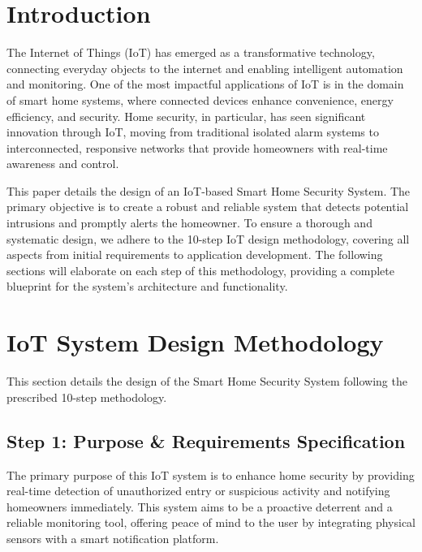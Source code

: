 \documentclass[conference]{IEEEtran}
\begin{document}

\section{Introduction}

The Internet of Things (IoT) has emerged as a transformative technology, connecting everyday objects to the internet and enabling intelligent automation and monitoring. One of the most impactful applications of IoT is in the domain of smart home systems, where connected devices enhance convenience, energy efficiency, and security. Home security, in particular, has seen significant innovation through IoT, moving from traditional isolated alarm systems to interconnected, responsive networks that provide homeowners with real-time awareness and control.

This paper details the design of an IoT-based Smart Home Security System. The primary objective is to create a robust and reliable system that detects potential intrusions and promptly alerts the homeowner. To ensure a thorough and systematic design, we adhere to the 10-step IoT design methodology, covering all aspects from initial requirements to application development. The following sections will elaborate on each step of this methodology, providing a complete blueprint for the system's architecture and functionality.


\section{IoT System Design Methodology}
This section details the design of the Smart Home Security System following the prescribed 10-step methodology.

\subsection{Step 1: Purpose \& Requirements Specification}
The primary purpose of this IoT system is to enhance home security by providing real-time detection of unauthorized entry or suspicious activity and notifying homeowners immediately. This system aims to be a proactive deterrent and a reliable monitoring tool, offering peace of mind to the user by integrating physical sensors with a smart notification platform.
\end{document}
